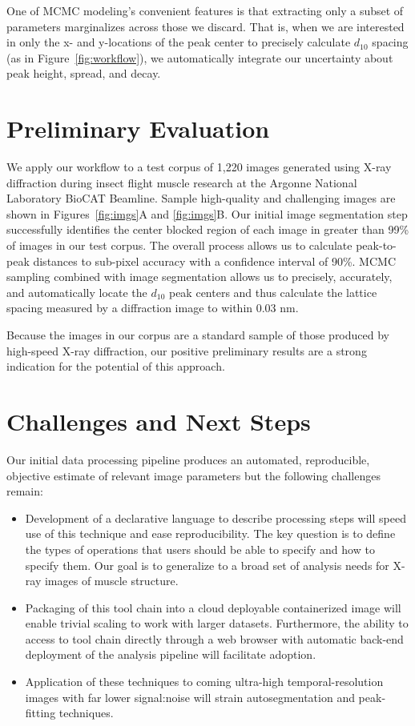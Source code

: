 \documentclass{sig-alternate}
\begin{document}
One of MCMC modeling's convenient features is that extracting only a
subset of parameters marginalizes across those we discard. That is,
when we are interested in only the x- and y-locations of the peak
center to precisely calculate $d_{10}$ spacing (as in
Figure~\ref{fig:workflow}), we automatically integrate our uncertainty
about peak height, spread, and decay.


\section{Preliminary Evaluation}
\label{sec:eval}

We apply our workflow to a test corpus of 1,220 images generated using
X-ray diffraction during insect flight muscle research at the Argonne
National Laboratory BioCAT Beamline. Sample high-quality and
challenging images are shown in Figures~\ref{fig:imgs}A and
\ref{fig:imgs}B.  Our initial image segmentation step successfully
identifies the center blocked region of each image in greater than
99\% of images in our test corpus. The overall process allows us to
calculate peak-to-peak distances to sub-pixel accuracy with a
confidence interval of 90\%. MCMC sampling combined with image
segmentation allows us to precisely, accurately, and automatically
locate the $d_{10}$ peak centers and thus calculate the lattice
spacing measured by a diffraction image to within 0.03 nm.

Because the images in our corpus are a standard sample of those
produced by high-speed X-ray diffraction, our positive preliminary
results are a strong indication for the potential of this approach.


\section{Challenges and Next Steps}
\label{sec:challenges}

Our initial data processing pipeline produces an automated,
reproducible, objective estimate of relevant image parameters but the
following challenges remain:

\begin{itemize}[noitemsep]
\item Development of a declarative language to describe processing
    steps will speed use of this technique and ease reproducibility.
    The key question is to define the types of operations that users
    should be able to specify and how to specify them. Our goal is to
    generalize to a broad set of analysis needs for X-ray images of
    muscle structure.
\item Packaging of this tool chain into a cloud deployable
    containerized image will enable trivial scaling to work with
    larger datasets. Furthermore, the ability to access to tool chain
    directly through a web browser with automatic back-end deployment
    of the analysis pipeline will facilitate adoption. 
\item Application of these techniques to coming ultra-high
    temporal-resolution images with far lower signal:noise will strain
    autosegmentation and peak-fitting techniques. 
\end{itemize}
\end{document}
